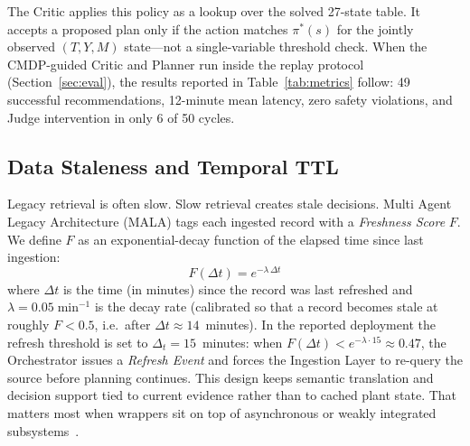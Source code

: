 \documentclass[conference]{IEEEtran}
\newcommand{\MALA}{Multi Agent Legacy Architecture (MALA)}
\begin{document}
\begin{table}[!t]
\sffamily
\caption{Solved Policy $\pi^*$ for Representative States Under Two Yard-Constraint Levels}\label{tab:policy}
\centering
\small
{}
\end{table}

The Critic applies this policy as a lookup over the solved 27-state table. It accepts a proposed plan only if the action matches $\pi^*(s)$ for the jointly observed $(T, Y, M)$ state---not a single-variable threshold check. When the CMDP-guided Critic and Planner run inside the replay protocol (Section~\ref{sec:eval}), the results reported in Table~\ref{tab:metrics} follow: 49 successful recommendations, 12-minute mean latency, zero safety violations, and Judge intervention in only 6 of 50 cycles.

\subsection{Data Staleness and Temporal TTL}

Legacy retrieval is often slow. Slow retrieval creates stale decisions. \MALA{} tags each ingested record with a \emph{Freshness Score} $F$. We define $F$ as an exponential-decay function of the elapsed time since last ingestion:
\begin{equation}
  F(\Delta t) = e^{-\lambda\,\Delta t}
  \label{eq:freshness}
\end{equation}
where $\Delta t$ is the time (in minutes) since the record was last refreshed and $\lambda = 0.05\;\text{min}^{-1}$ is the decay rate (calibrated so that a record becomes stale at roughly $F < 0.5$, i.e.\ after $\Delta t \approx 14$~minutes). In the reported deployment the refresh threshold is set to $\Delta_t = 15$~minutes: when $F(\Delta t) < e^{-\lambda \cdot 15} \approx 0.47$, the Orchestrator issues a \emph{Refresh Event} and forces the Ingestion Layer to re-query the source before planning continues. This design keeps semantic translation and decision support tied to current evidence rather than to cached plant state. That matters most when wrappers sit on top of asynchronous or weakly integrated subsystems~\cite{comella2000,fogliatto2020}.
\end{document}
